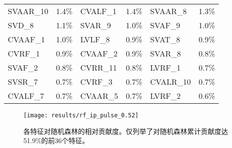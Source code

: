 \begin{center}
\begin{longtable}{m{2cm}<{\centering}m{2cm}<{\centering}m{2cm}<{\centering}m{2cm}<{\centering}m{2cm}<{\centering}m{2cm}<{\centering}}
            \cellcolor{pink}SVAAR\_10                        & \cellcolor{pink}1.4\%                            & \cellcolor{cyan}CVALF\_1                         & \cellcolor{cyan}1.4\%                            & \cellcolor{pink}SVAAR\_8                         & \cellcolor{pink}1.3\%                            \\
            SVD\_8                                           & 1.1\%                                            & \cellcolor{pink}SVAR\_9                          & \cellcolor{pink}1.0\%                            & \cellcolor{cyan}SVAF\_9                          & \cellcolor{cyan}1.0\%                            \\
            \cellcolor{cyan}CVAAF\_1                         & \cellcolor{cyan}1.0\%                            & \cellcolor{cyan}LVLF\_8                          & \cellcolor{cyan}0.9\%                            & SVAT\_8                          & 0.9\%                            \\
            \cellcolor{cyan}CVRF\_1                          & \cellcolor{cyan}0.9\%                            & \cellcolor{cyan}CVAAF\_2                         & \cellcolor{cyan}0.9\%                            & \cellcolor{pink}SVAR\_8                          & \cellcolor{pink}0.8\%                            \\
            \cellcolor{cyan}SVAF\_2                          & \cellcolor{cyan}0.8\%                            & \cellcolor{pink}CVRR\_11                         & \cellcolor{pink}0.8\%                            & \cellcolor{cyan}LVRF\_1                          & \cellcolor{cyan}0.7\%                            \\
            \cellcolor{pink}SVSR\_7                          & \cellcolor{pink}0.7\%                            & \cellcolor{cyan}CVRF\_3                          & \cellcolor{cyan}0.7\%                            & \cellcolor{pink}CVALR\_10                        & \cellcolor{pink}0.7\%                            \\
            \cellcolor{cyan}CVALF\_7                         & \cellcolor{cyan}0.7\%                            & \cellcolor{pink}CVAAR\_5                         & \cellcolor{pink}0.7\%                            & \cellcolor{cyan}LVRF\_2                          & \cellcolor{cyan}0.6\%                           
      \end{longtable}
\end{center}

\begin{figure}[htbp]
      \centering
      \texttt{[image: results/rf\_ip\_pulse\_0.52]}
      \caption[各特征对随机森林的相对贡献度]{\label{fig:rf_importance_pulse}各特征对随机森林的相对贡献度。仅列举了对随机森林累计贡献度达51.9\%的前36个特征。}
\end{figure}

